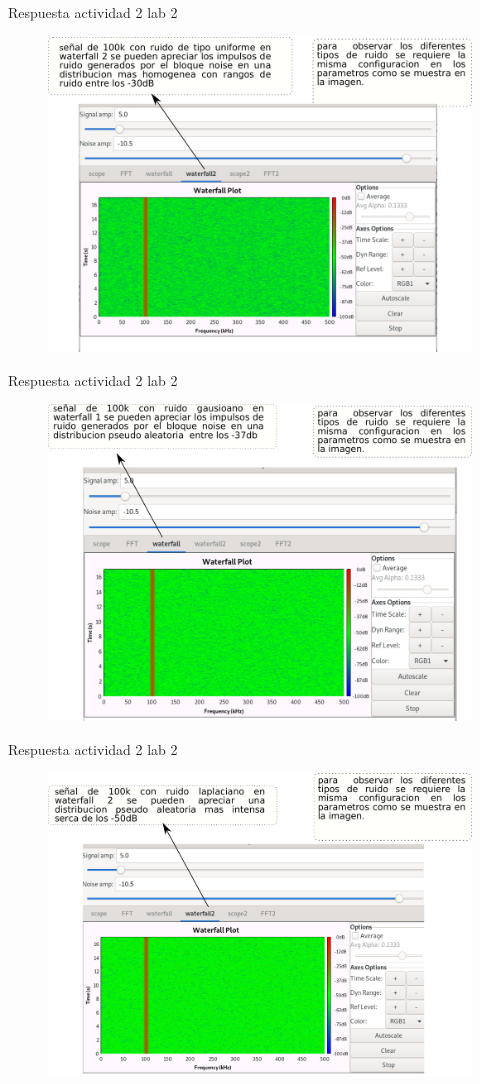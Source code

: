 \begin{frame}{Respuesta actividad 2 lab 2}
\begin{figure}[H]
\centering
\includegraphics[width=\textwidth, height=0.58\textwidth]{soluciones/actividad-2-1/pdf/Rlab2_4.pdf}
\end{figure}
\end{frame}
\begin{frame}{Respuesta actividad 2 lab 2}
\begin{figure}[H]
\centering
\includegraphics[width=\textwidth, height=0.58\textwidth]{soluciones/actividad-2-1/pdf/Rlab2_5.pdf}
\end{figure}
\end{frame}
\begin{frame}{Respuesta actividad 2 lab 2}
\begin{figure}[H]
\centering
\includegraphics[width=\textwidth, height=0.58\textwidth]{soluciones/actividad-2-1/pdf/Rlab2_6.pdf}
\end{figure}
\end{frame}